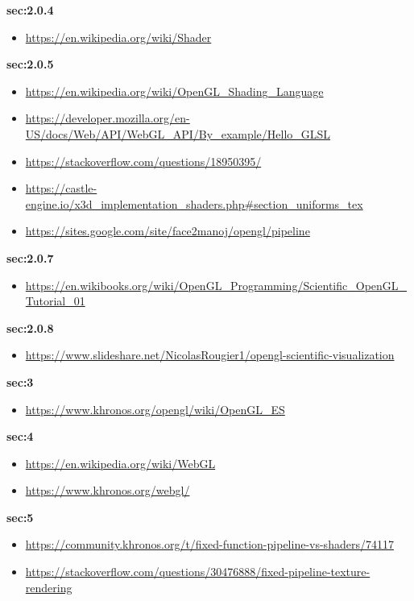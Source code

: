 \documentclass[onecolumn]{article}
\begin{document}
\textbf{sec:2.0.4}
\begin{itemize}
\item \url{https://en.wikipedia.org/wiki/Shader}
\end{itemize}

\textbf{sec:2.0.5}
\begin{itemize}
\item \url{https://en.wikipedia.org/wiki/OpenGL_Shading_Language}
\item \url{https://developer.mozilla.org/en-US/docs/Web/API/WebGL_API/By_example/Hello_GLSL}
\item \url{https://stackoverflow.com/questions/18950395/}
\item \url{https://castle-engine.io/x3d_implementation_shaders.php#section_uniforms_tex}
\item \url{https://sites.google.com/site/face2manoj/opengl/pipeline}
\end{itemize}

\textbf{sec:2.0.7}
\begin{itemize}
\item \url{https://en.wikibooks.org/wiki/OpenGL_Programming/Scientific_OpenGL_Tutorial_01}
\end{itemize}

\textbf{sec:2.0.8}
\begin{itemize}
\item \url{https://www.slideshare.net/NicolasRougier1/opengl-scientific-visualization}
\end{itemize}

\textbf{sec:3}
\begin{itemize}
\item \url{https://www.khronos.org/opengl/wiki/OpenGL_ES} \end{itemize}

\textbf{sec:4}
\begin{itemize}
\item \url{https://en.wikipedia.org/wiki/WebGL} 
\item \url{https://www.khronos.org/webgl/} 
\end{itemize}

\textbf{sec:5}
\begin{itemize}
\item \url{https://community.khronos.org/t/fixed-function-pipeline-vs-shaders/74117} 
\item \url{https://stackoverflow.com/questions/30476888/fixed-pipeline-texture-rendering} 
\end{itemize}
 
\nocite{*}


\end{document}
